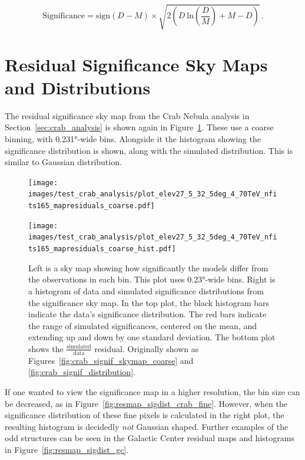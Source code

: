 \begin{equation}\label{eqn:resmap_signif2}
  \textrm{Significance} = \textrm{sign}(D-M) \times \sqrt{ 2 \left ( D \: \textrm{ln} \left ( \frac{D}{M} \right ) + M - D \right ) } \,.
\end{equation}

\section{Residual Significance Sky Maps and Distributions}

The residual significance sky map from the Crab Nebula analysis in Section~\ref{sec:crab_analysis} is shown again in Figure~\ref{fig:resmap_sigdist_crab_coarse}.
These use a coarse binning, with \ang{0.231}-wide bins.
Alongside it the histogram showing the significance distribution is shown, along with the simulated distribution.
This is similar to Gaussian distribution.

\begin{figure}[h]
  \centering
  \hfill
  \begin{minipage}{0.4\textwidth}
    \centering
    \texttt{[image: images/test\_crab\_analysis/plot\_elev27\_5\_32\_5deg\_4\_70TeV\_nfits165\_mapresiduals\_coarse.pdf]}
  \end{minipage}
  \hfill
  \begin{minipage}{0.45\textwidth}
    \centering
    \texttt{[image: images/test\_crab\_analysis/plot\_elev27\_5\_32\_5deg\_4\_70TeV\_nfits165\_mapresiduals\_coarse\_hist.pdf]}
  \end{minipage}
  \hfill
  \hfill
  \caption[Crab Residual Sky Map and Distribution, Coarse Binning]{
    Left is a sky map showing how significantly the models differ from the observations in each bin.
    This plot uses \ang{0.23}-wide bins.
    Right is a histogram of data and simulated significance distributions from the significance sky map.
    In the top plot, the black histogram bars indicate the data's significance distribution.
    The red bars indicate the range of simulated significances, centered on the mean, and extending up and down by one standard deviation.
    The bottom plot shows the $\frac{\textrm{simulated}}{\textrm{data}}$ residual.
    Originally shown as Figures~\ref{fig:crab_signif_skymap_coarse} and \ref{fig:crab_signif_distribution}.
  }
  \label{fig:resmap_sigdist_crab_coarse}
\end{figure}

If one wanted to view the significance map in a higher resolution, the bin size can be decreased, as in Figure~\ref{fig:resmap_sigdist_crab_fine}.
However, when the significance distribution of these fine pixels is calculated in the right plot, the resulting histogram is decidedly \textit{not} Gaussian shaped.
Further examples of the odd structures can be seen in the Galactic Center residual maps and histograms in Figure~\ref{fig:resmap_sigdist_gc}.

